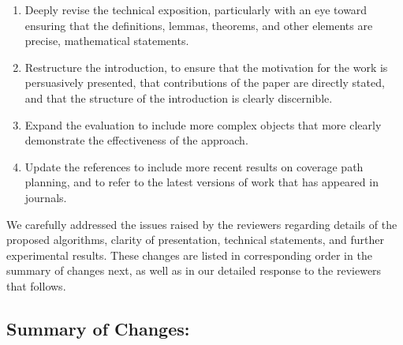 \documentclass[11pt]{article}
\newenvironment{reviewer}
{\begin{mdframed}[roundcorner = 10pt,fontcolor=blue!70!black]\itshape}
{\end{mdframed}}
\begin{document}
\begin{enumerate}[I.]
\begin{reviewer}
\begin{enumerate}
\item Deeply revise the technical exposition, particularly with an eye toward ensuring that the definitions, lemmas, theorems, and other elements are precise, mathematical statements. 

\item Restructure the introduction, to ensure that the motivation for the work is persuasively presented, that contributions of the paper are directly stated, and that the structure of the introduction is clearly discernible. 
\item Expand the evaluation to include more complex objects that more clearly demonstrate the effectiveness of the approach. 
\item Update the references to include more recent results on coverage path planning, and to refer to the latest versions of work that has appeared in journals. 
\end{enumerate}


  \end{reviewer}
  \noindent
 We carefully addressed the issues raised by the reviewers regarding details of the proposed algorithms, clarity of presentation, technical statements, and further experimental results. These changes are listed in corresponding order in the summary of changes next, as well as in our detailed response to the reviewers that follows. %
\end{enumerate}

\subsection*{Summary of Changes:}
\end{document}
